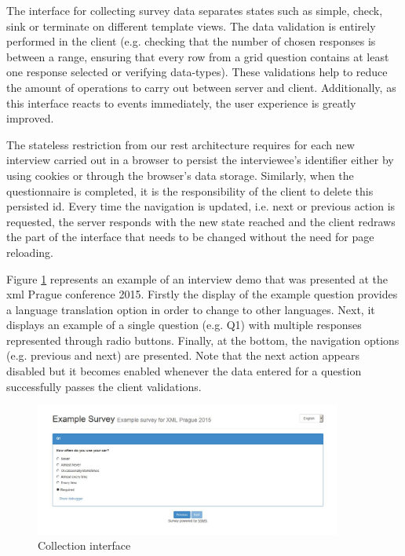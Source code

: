 	The interface for collecting survey data separates states such as simple, check, sink or terminate on different template views. The data validation is entirely performed in the client (e.g. checking that the number of chosen responses is between a range, ensuring that every row from a grid question contains at least one response selected or verifying data-types). These validations help to reduce the amount of operations to carry out between server and client. Additionally, as this interface reacts to events immediately, the user experience is greatly improved.

	The stateless restriction from our \gls{rest} architecture requires for each new interview carried out in a browser to persist the interviewee's identifier either by using cookies or through the browser's data storage. Similarly, when the questionnaire is completed, it is the responsibility of the client to delete this persisted id. Every time the navigation is updated, i.e. next or previous action is requested, the server responds with the new state reached and the client redraws the part of the interface that needs to be changed without the need for page reloading.
	
	Figure \ref{fig:impl:collectionInterface} represents an example of an interview demo that was presented at the \gls{xml} Prague conference 2015. %
	Firstly the display of the example question provides a language translation option in order to change to other languages. Next, it displays an example of a single question (e.g. Q1) with multiple responses represented through radio buttons. Finally, at the bottom, the navigation options (e.g. previous and next) are presented. Note that the next action appears disabled but it becomes enabled whenever the data entered for a question successfully passes the client validations.

	\begin{figure}[h]
	\centering
	\includegraphics[width=0.90\textwidth]{implementation/img/collection}
	\caption{Collection interface}
	\label{fig:impl:collectionInterface}
	\end{figure}
